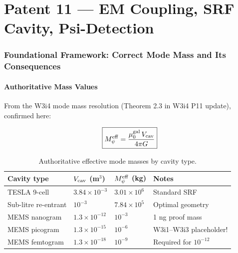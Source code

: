 \documentclass[11pt]{article}
\theoremstyle{definition}
\theoremstyle{remark}
\newcommand{\Meff}{M_\psi^{\rm eff}}
\newcommand{\muG}{\mu_0^{\rm gal}}
\newcommand{\Vcav}{V_{\rm cav}}
\newcommand{\ee}[1]{\times 10^{#1}}
\begin{document}

\newpage
\part{Patent 11 --- EM Coupling, SRF Cavity, Psi-Detection}

\section{Foundational Framework: Correct Mode Mass and Its Consequences}
\label{sec:p11_foundation}

\subsection{Authoritative Mass Values}

From the W3i4 mode mass resolution (Theorem 2.3 in W3i4 P11 update),
confirmed here:

\begin{equation}
\boxed{
\Meff = \frac{\muG\,\Vcav}{4\pi G}
}
\label{eq:meff_master}
\end{equation}

\begin{table}[h]
\centering
\caption{Authoritative effective mode masses by cavity type.}
\label{tab:meff_values}
\begin{tabular}{@{}llll@{}}
\toprule
Cavity type & $\Vcav$ (m$^3$) & $\Meff$ (kg) & Notes \\
\midrule
TESLA 9-cell & $3.84\ee{-3}$ & $3.01\ee{6}$ & Standard SRF \\
Sub-litre re-entrant & $10^{-3}$ & $7.84\ee{5}$ & Optimal geometry \\
MEMS nanogram & $1.3\ee{-12}$ & $10^{-3}$ & 1 ng proof mass \\
MEMS picogram & $1.3\ee{-15}$ & $10^{-6}$ & W3i1--W3i3 placeholder! \\
MEMS femtogram & $1.3\ee{-18}$ & $10^{-9}$ & Required for $10^{-12}$ \\
\bottomrule
\end{tabular}
\end{table}
\end{document}
